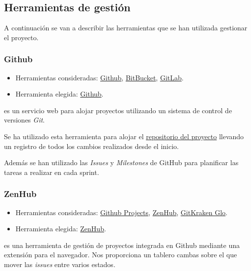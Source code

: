 \subsection{Herramientas de gestión}

A continuación se van a describir las herramientas que se han utilizada gestionar el proyecto.

\subsubsection{Github} \label{github}

\begin{itemize}
	\tightlist
	\item
	Herramientas consideradas:
	\href{https://github.com/}{Github}, 
	\href{https://bitbucket.org/product}{BitBucket},
	\href{https://about.gitlab.com/}{GitLab}.
	\item
	Herramienta elegida:
	\href{https://github.com/}{Github}.
\end{itemize}

 es un servicio web para alojar proyectos utilizando un sistema de control de versiones \textit{Git}.

Se ha utilizado esta herramienta para alojar el \href{https://github.com/IvanArjona/TFG-Datos-publicos}{repositorio del proyecto} llevando un registro de todos los cambios realizados desde el inicio.

Además se han utilizado las \textit{Issues} y \textit{Milestones} de GitHub para planificar las tareas a realizar en cada sprint.

\subsubsection{ZenHub} \label{zenhub}

\begin{itemize}
	\tightlist
	\item
	Herramientas consideradas:
	\href{https://help.github.com/articles/about-project-boards/}{Github Projects}, 
	\href{https://www.zenhub.com/}{ZenHub},
	\href{https://www.gitkraken.com/glo}{GitKraken Glo}.
	\item
	Herramienta elegida:
	\href{https://www.zenhub.com/}{ZenHub}.
\end{itemize}

 es una herramienta de gestión de proyectos integrada en Github mediante una extensión para el navegador. Nos proporciona un tablero cambas sobre el que mover las \textit{issues} entre varios estados.

